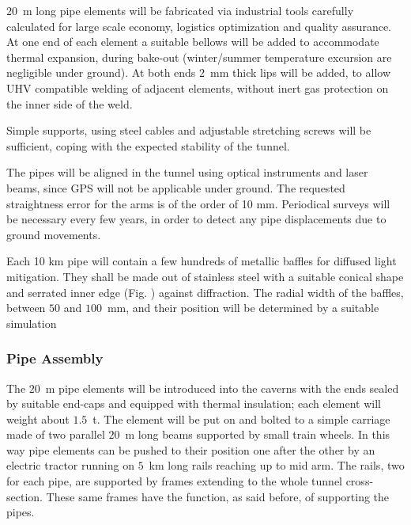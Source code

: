$20$~m long pipe elements will be fabricated via industrial tools carefully calculated for large scale economy, logistics optimization and quality assurance. At one end of each element a suitable bellows will be added to accommodate thermal expansion, during bake-out (winter/summer temperature excursion are negligible under ground). At both ends $2$~mm thick lips will be added, to allow UHV compatible welding of adjacent elements, without inert gas protection on the inner side of the weld. 

Simple supports, using steel cables and adjustable stretching screws will be sufficient, coping with the expected stability of the tunnel. 

The pipes will be aligned in the tunnel using optical instruments and laser beams, since GPS will not be applicable under ground. The requested straightness error for the arms is of the order of 10 mm. Periodical surveys will be necessary every few years, in order to detect any pipe displacements due to ground movements. 

Each 10 km pipe will contain a few hundreds of metallic baffles for diffused light mitigation. They shall be made out of stainless steel with a suitable conical shape and serrated inner edge (Fig. %
) against diffraction. The radial width of the baffles, between $50$ and $100$~mm, and their position will be determined by a suitable simulation %

\subsubsection{Pipe Assembly} 
The $20$~m pipe elements will be introduced into the caverns with the ends sealed by suitable end-caps and equipped with thermal insulation; each element will weight about $1.5$~t. The element will be put on and bolted to a simple carriage made of two parallel $20$~m long beams supported by small train wheels. In this way pipe elements can be pushed to their position one after the other by an electric tractor running on $5$~km long rails reaching up to mid arm. The rails, two for each pipe, are supported by frames extending to the whole tunnel cross-section. These same frames have the function, as said before, of supporting the pipes. 

